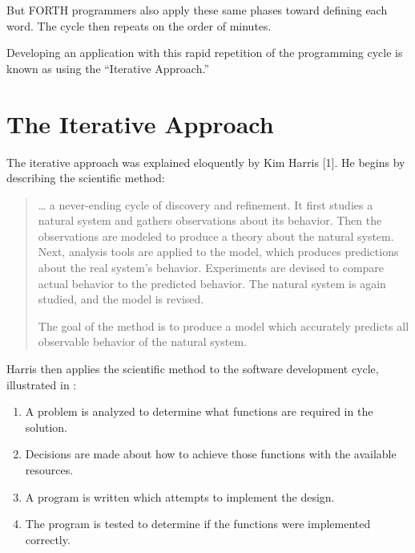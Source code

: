 
But FORTH programmers also apply these same phases toward
defining each word. The cycle then repeats on the order of minutes.

Developing an application with this rapid repetition of the
programming cycle is known as using the ``Iterative Approach.''

\section{The Iterative Approach}

\noindent The iterative approach was explained eloquently by Kim
Harris {[}1{]}. He begins by describing the scientific method:

\begin{quotation}
\noindent \dots{} a never-ending cycle of discovery and refinement. It
first studies a natural system and gathers observations about its
behavior. Then the observations are modeled to produce a theory about
the natural system.  Next, analysis tools are applied to the model,
which produces predictions about the real system's behavior.
Experiments are devised to compare actual behavior to the predicted
behavior. The natural system is again studied, and the model is
revised.

The goal of the method is to produce a model which accurately predicts all
observable behavior of the natural system.
\end{quotation}

\noindent Harris then applies the scientific method to the software development
cycle, illustrated in :


\begin{enumerate}

\item A problem is analyzed to determine what functions are required
in the solution.

\item Decisions are made about how to achieve those functions with the
available resources.

\item A program is written which attempts to implement the design.
\item The program is tested to determine if the functions were
implemented correctly.

\end{enumerate}

